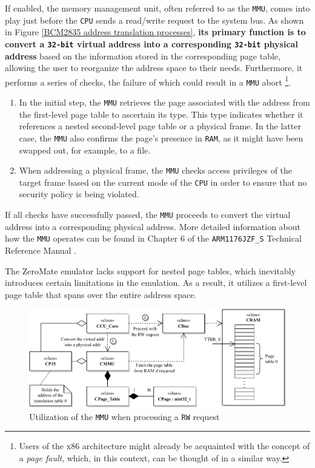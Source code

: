 \documentclass[english, ing, kiv, he, iso690numb, pdf]{fasthesis}
\begin{document}
	If enabled, the memory management unit, often referred to as the \texttt{MMU}, comes into play just before the \texttt{CPU} sends a read/write request to the system bus. As shown in Figure \ref{BCM2835 address translation processes}, \textbf{its primary function is to convert a \texttt{32-bit} virtual address into a corresponding \texttt{32-bit} physical address} based on the information stored in the corresponding page table, allowing the user to reorganize the address space to their needs. Furthermore, it performs a series of checks, the failure of which could result in a \texttt{MMU} abort \footnote{Users of the x86 architecture might already be acquainted with the concept of a \textit{page fault}, which, in this context, can be thought of in a similar way.}.
	
	\begin{enumerate}
		\item In the initial step, the \texttt{MMU} retrieves the page associated with the address from the first-level page table to ascertain its type. This type indicates whether it references a nested second-level page table or a physical frame. In the latter case, the \texttt{MMU} also confirms the page's presence in \texttt{RAM}, as it might have been swapped out, for example, to a file.
		
		\item When addressing a physical frame, the \texttt{MMU} checks access privileges of the target frame based on the current mode of the \texttt{CPU} in order to ensure that no security policy is being violated.
	\end{enumerate}
	
	If all checks have successfully passed, the \texttt{MMU} proceeds to convert the virtual address into a corresponding physical address. More detailed information about how the \texttt{MMU} operates can be found in Chapter 6 of the \texttt{ARM1176JZF\_S} Technical Reference Manual \cite{ARM1176JZF-S}.
	
	\begin{important}
		The ZeroMate emulator lacks support for nested page tables, which inevitably introduces certain limitations in the emulation. As a result, it utilizes a first-level page table that spans over the entire address space.
	\end{important}
	
	\begin{figure}[ht]
		\centering
		\includegraphics[width=1.0\textwidth]{img/diagrams/mmu.pdf}
		\caption{Utilization of the \texttt{MMU} when processing a \texttt{RW} request}
		\label{Utilization of the MMU when processing a RW request}
	\end{figure}
	
\end{document}
